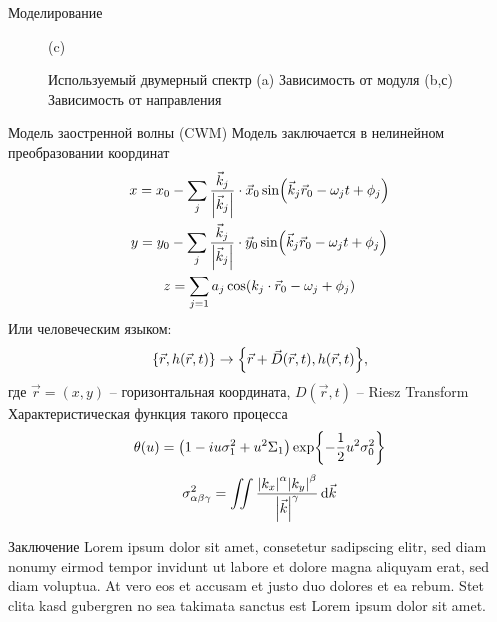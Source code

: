 \begin{frame}[t]{}
\begin{columns}[t]
\begin{column}{.48\linewidth}
\begin{block}{Моделирование}
\begin{figure}[h]
\begin{minipage}{0.32\linewidth}
                \centering
                (c)
            \end{minipage}
            \caption{Используемый двумерный спектр (a) Зависимость от модуля (b,с) Зависимость от направления}
        \end{figure}
        \end{block}
        \begin{block}{Модель заостренной волны (CWM)}
            Модель заключается в нелинейном преобразовании координат
            \begin{gather}
                x = x_{0} - \sum\limits_{j} \frac{\vec k_j}{\abs{\vec k_j}} \cdot \vec x_{0} \sin(\vec k_j \vec r_{0} - \omega_j t + \phi_j) \\
                y = y_{0} - \sum\limits_{j} \frac{\vec k_j}{\abs{\vec k_j}} \cdot \vec y_{0} \sin(\vec k_j \vec r_{0} - \omega_j t + \phi_j) \\
                z =  \sum\limits_{j=1} a_j \cos(k_j \cdot \vec r_{0} - \omega_j + \phi_j)
            \end{gather}
            Или человеческим языком:
            \begin{equation}
                \label{eq:}
                \qty{\vec r, h(\vec r,t)} \to \qty{\vec r + \vec D(\vec r,t), h(\vec r,t)},
            \end{equation}
            где $\vec r = (x,y)$ -- горизонтальная координата, $D(\vec r,t)$ -- Riesz Transform
            Характеристическая функция такого процесса
            \begin{equation}
                \label{eq:}
                \theta(u) = \qty(1 - i u \sigma_1^2 + u^2 \Sigma_1) \exp{-\frac{1}{2} u^2 \sigma_0^2}
            \end{equation}
            \begin{equation}
                \label{eq:}
                \sigma^2_{\alpha \beta \gamma} = \iint \frac{ \abs{k_x}^{\alpha} \abs{k_y}^{\beta}}{\abs{\vec k}^{\gamma}} \dd{\vec k}
            \end{equation}
        \end{block}
        \begin{block}{Заключение}
            Lorem ipsum dolor sit amet, consetetur sadipscing elitr, sed diam nonumy eirmod
            tempor invidunt ut labore et dolore magna aliquyam erat, sed diam voluptua. At
            vero eos et accusam et justo duo dolores et ea rebum. Stet clita kasd gubergren
            no sea takimata sanctus est Lorem ipsum dolor sit amet.
        \end{block}

\end{column}
\end{columns}
\end{frame}

